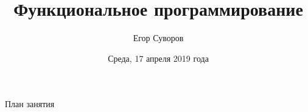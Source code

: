 \documentclass[utf8,xcolor=table]{beamer}
\title{Функциональное программирование}
\author{Егор Суворов}
\institute[СПбГУ]{Курс <<Парадигмы и языки программирования>>, группа 18.Б09-пу}
\date[17.04.2019]{Среда, 17 апреля 2019 года}
\begin{document}
\begin{frame}
\titlepage
\end{frame}

\begin{frame}{План занятия}
	\tableofcontents
\end{frame}












\end{document}
